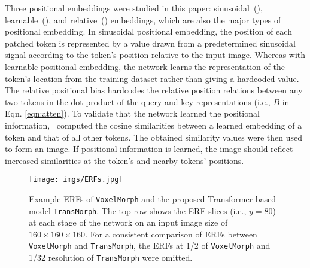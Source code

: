 \documentclass[times,twocolumn,final]{elsarticle}
\begin{document}
Three positional embeddings were studied in this paper: sinusoidal~(\cite{vaswani2017attention}), learnable~(\cite{dosovitskiy2020image}), and relative~(\cite{liu2021swin}) embeddings, which are also the major types of positional embedding. In sinusoidal positional embedding, the position of each patched token is represented by a value drawn from a predetermined sinusoidal signal according to the token's position relative to the input image. Whereas with learnable positional embedding, the network learns the representation of the token's location from the training dataset rather than giving a hardcoded value. The relative positional bias hardcodes the relative position relations between any two tokens in the dot product of the query and key representations (i.e., $B$ in Eqn. \ref{eqn:atten}). To validate that the network learned the positional information,~\cite{dosovitskiy2020image} computed the cosine similarities between a learned embedding of a token and that of all other tokens. The obtained similarity values were then used to form an image. If positional information is learned, the image should reflect increased similarities at the token's and nearby tokens' positions.
\begin{figure*}[!t]
\centering
\texttt{[image: imgs/ERFs.jpg]}
\caption{Example ERFs of \texttt{VoxelMorph} and the proposed Transformer-based model \texttt{TransMorph}. The top row shows the ERF slices (i.e., $y=80$) at each stage of the network on an input image size of $160\times160\times160$. For a consistent comparison of ERFs between \texttt{VoxelMorph} and \texttt{TransMorph}, the ERFs at 1/2 of \texttt{VoxelMorph} and 1/32 resolution of \texttt{TransMorph} were omitted.\label{fig:ERF_example}}
\end{figure*}
\end{document}
